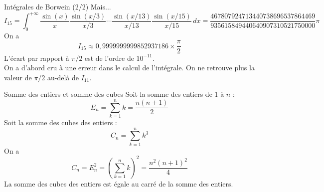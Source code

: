 \documentclass[aspectratio=1610,10pt,dvipsnames]{beamer}
\begin{document}
\begin{frame}{Intégrales de Borwein (2/2)}
Mais...
\begin{equation*}
 I_{15} = \int_{0}^{+\infty} \frac{\sin(x)}{x} \frac{\sin(x/3)}{x/3} 
  \cdots \frac{\sin(x/13)}{x/13} \frac{\sin(x/15)}{x/15} \, dx = 
  \frac{467807924713440738696537864469}{935615849440640907310521750000}\pi
\end{equation*}
On a 
\begin{equation*}
     I_{15} \approx 0,9999999999852937186 \times \frac{\pi}{2}
\end{equation*}
L'écart par rapport à $\pi/2$ est de l'ordre de $10^{-11}$. 
\\[0.5em]
On a d'abord cru à une erreur dans le calcul de l'intégrale. On ne retrouve
plus la valeur de $\pi/2$ au-delà de $I_{11}$.
\end{frame}

\begin{frame}{Somme des entiers et somme des cubes}
Soit la somme des entiers de $1$ à $n$ :
\begin{equation*}
    E_n = \sum_{k=1}^n k = \frac{n(n+1)}{2}
\end{equation*}
Soit la somme des cubes des entiers :
\begin{equation*}
    C_n = \sum_{k=1}^n k^3 
\end{equation*}
On a 
\begin{equation*}
    C_n = E_n^2 = \left( \sum_{k=1}^n k \right)^2 = \frac{n^2(n+1)^2}{4}
\end{equation*}
La somme des cubes des entiers est égale au carré de la somme des entiers. 
\end{frame}
\end{document}

